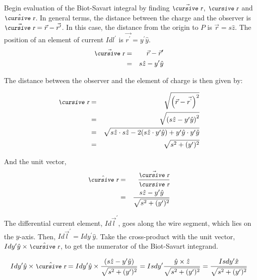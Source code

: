 \documentclass[12pt]{article}
\begin{document}
\begin{flushleft}
Begin evaluation of the Biot-Savart integral by finding $\vec{\text{\small\slshape\cursive r}}$, $\text{\small\slshape\cursive r}$ and $\hat{\text{\small\slshape\cursive r}}$.  In general terms, the distance between the charge and the observer is $\vec{\text{\small\slshape\cursive r}}=\vec{r}-\vec{r^{\prime}}$.  In this case, the distance from the origin to $P$ is $\vec{r}=s\hat{z}$.  The position of an element of current $Idl^{\prime}$ is $\vec{r^{\prime}}=y^{\prime}\hat{y}$.
\begin{eqnarray*}
\vec{\text{\small\slshape\cursive r}} & =& \vec{r}-\vec{r}^{\prime} \\
& = & s\hat{z}-y^{\prime}\hat{y}
\end{eqnarray*}

The distance between the observer and the element of charge is then given by:

\begin{eqnarray*}
 \text{\small\slshape\cursive r} & =& \sqrt{ \left( \vec{r} - \vec{r^{`}} \right)^{2} } \\
 & = & \sqrt{ \left( s\hat{z} - y^{\prime}\hat{y} \right)^{2} } \\
 & = & \sqrt{  s\hat{z} \cdot s\hat{z} -2(s\hat{z} \cdot y^{\prime}\hat{y}) + y^{\prime}\hat{y} \cdot y^{\prime}\hat{y} } \\
  & = & \sqrt{  s^{2} + (y^{\prime})^{2} } 
\end{eqnarray*}

And the unit vector,
\begin{eqnarray*}
\hat{\text{\small\slshape\cursive r}} & =& \frac{\vec{\text{\small\slshape\cursive r}}}{\text{\small\slshape\cursive r}} \\
& = & \frac{s\hat{z}-y^{\prime}\hat{y}}{\sqrt{ s^{2}+(y^{\prime})^{2}}}
\end{eqnarray*}

The differential current element, $Id\vec{l}^{\prime}$, goes along the wire segment, which lies on the $y$-axis.  Then, $Id\vec{l}^{\prime}=Idy^{\prime}\hat{y}$.  Take the cross-product with the unit vector, $Idy^{\prime}\hat{y} \times  \hat{\text{\small\slshape\cursive r}}$, to get the  numerator of the Biot-Savart integrand.

\[
Idy^{\prime}\hat{y} \times  \hat{\text{\small\slshape\cursive r}}=Idy^{\prime}\hat{y} \times \frac{(s\hat{z}-y^{\prime}\hat{y})}{\sqrt{ s^{2}+(y^{\prime})^{2}}} = Isdy^{\prime}\frac{\hat{y} \times \hat{z}}{\sqrt{ s^{2}+(y^{\prime})^{2}}} = \frac{Isdy^{\prime} \hat{x}}{\sqrt{ s^{2}+(y^{\prime})^{2}}}
\]


\end{flushleft}
\end{document}
